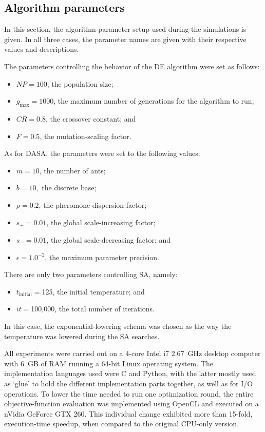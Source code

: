 \subsection{Algorithm parameters}

In this section, the algorithm-parameter setup used during the simulations
is given. In all three cases, the parameter names are given with their
respective values and descriptions.

The parameters controlling the behavior of the DE algorithm were set
as follows:
\begin{itemize}
\item $NP=100$, the population size;
\item $g_{\mathrm{max}}=1000$, the maximum number of generations for the
algorithm to run;
\item $CR=0.8$, the crossover constant; and
\item $F=0.5$, the mutation-scaling factor.
\end{itemize}
As for DASA, the parameters were set to the following values:
\begin{itemize}
\item $m=10$, the number of ants;
\item $b=10,$ the discrete base;
\item $\rho=0.2$, the pheromone dispersion factor;
\item $s_{+}=0.01$, the global scale-increasing factor;
\item $s_{-}=0.01$, the global scale-decreasing factor; and 
\item $\epsilon=1.0^{-2}$, the maximum parameter precision.
\end{itemize}
There are only two parameters controlling SA, namely:
\begin{itemize}
\item $t_{\mathrm{initial}}=$125, the initial temperature; and
\item $it=$100,000, the total number of iterations.
\end{itemize}
In this case, the exponential-lowering schema was chosen as the way
the temperature was lowered during the SA searches.

\bigskip{}


All experiments were carried out on a 4-core Intel i7 2.67~GHz desktop
computer with 6~GB of RAM running a 64-bit Linux operating system.
The implementation languages used were C and Python, with the latter
mostly used as \textquoteleft{}glue\textquoteright{} to hold the different
implementation parts together, as well as for I/O operations. To lower
the time needed to run one optimization round, the entire objective-function
evaluation was implemented using OpenCL and executed on a nVidia GeForce
GTX 260. This individual change exhibited more than 15-fold, execution-time
speedup, when compared to the original CPU-only version.

